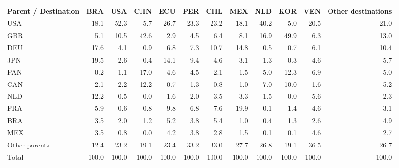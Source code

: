 \begin{tabular}{lrrrrrrrrrrr}
\toprule
Parent / Destination & BRA & USA & CHN & ECU & PER & CHL & MEX & NLD & KOR & VEN & Other destinations \\
\midrule
USA & 18.1 & 52.3 & 5.7 & 26.7 & 23.3 & 23.2 & 18.1 & 40.2 & 5.0 & 20.5 & 21.0 \\
GBR & 5.1 & 10.5 & 42.6 & 2.9 & 4.5 & 6.4 & 8.1 & 16.9 & 49.9 & 6.3 & 13.0 \\
DEU & 17.6 & 4.1 & 0.9 & 6.8 & 7.3 & 10.7 & 14.8 & 0.5 & 0.7 & 6.1 & 10.4 \\
JPN & 19.5 & 2.6 & 0.4 & 14.1 & 9.4 & 4.6 & 3.1 & 1.3 & 0.3 & 4.6 & 5.7 \\
PAN & 0.2 & 1.1 & 17.0 & 4.6 & 4.5 & 2.1 & 1.5 & 5.0 & 12.3 & 6.9 & 5.0 \\
CAN & 2.1 & 2.2 & 12.2 & 0.7 & 1.3 & 0.8 & 1.0 & 7.0 & 10.0 & 1.6 & 5.2 \\
NLD & 12.2 & 0.5 & 0.0 & 1.6 & 2.0 & 3.5 & 3.3 & 1.5 & 0.0 & 5.6 & 2.3 \\
FRA & 5.9 & 0.6 & 0.8 & 9.8 & 6.8 & 7.6 & 19.9 & 0.1 & 1.4 & 4.6 & 3.1 \\
BRA & 3.5 & 2.0 & 1.2 & 5.2 & 3.8 & 5.4 & 1.0 & 0.4 & 1.3 & 2.6 & 4.9 \\
MEX & 3.5 & 0.8 & 0.0 & 4.2 & 3.8 & 2.8 & 1.5 & 0.1 & 0.1 & 4.6 & 2.7 \\
Other parents & 12.4 & 23.2 & 19.1 & 23.4 & 33.2 & 33.0 & 27.7 & 26.8 & 19.1 & 36.5 & 26.7 \\
\midrule
Total & 100.0 & 100.0 & 100.0 & 100.0 & 100.0 & 100.0 & 100.0 & 100.0 & 100.0 & 100.0 & 100.0 \\
\bottomrule
\end{tabular}
